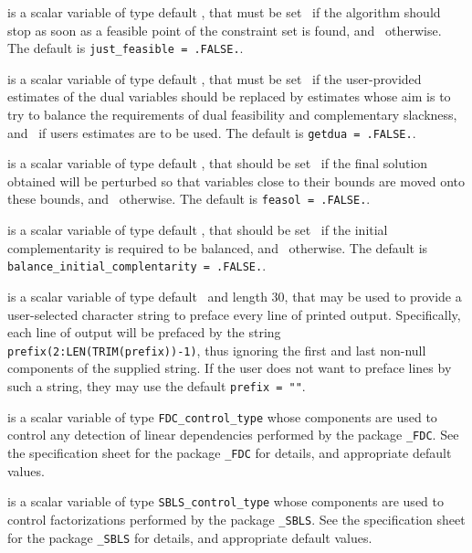 \documentclass{galahad}
\begin{document}
\begin{description}
 is a scalar variable of type default \logical, that 
must be set \true\ if the algorithm should stop as soon as a feasible point
of the constraint set is found, and \false\ otherwise. 
The default is {\tt just\_feasible = .FALSE.}.

 is a scalar variable of type default \logical, that 
must be set \true\ if the user-provided estimates of the dual variables
should be replaced by estimates whose aim is to try to balance the
requirements of dual feasibility and complementary slackness,
and \false\ if users estimates are to be used.
The default is {\tt getdua = .FALSE.}.

 is a scalar variable of type default \logical, that 
should be set \true\ 
if the final solution obtained will be perturbed 
so that variables close to their bounds are moved onto these bounds,
and \false\ otherwise. 
The default is {\tt feasol = .FALSE.}.


 is a scalar variable of type 
default \logical, that should be set \true\
if the initial complementarity is required to be balanced,
and \false\ otherwise.
The default is {\tt balance\_initial\_complentarity = .FALSE.}.

\itt{prefix} is a scalar variable of type default \character\
and length 30, that may be used to provide a user-selected 
character string to preface every line of printed output. 
Specifically, each line of output will be prefaced by the string 
{\tt prefix(2:LEN(TRIM(prefix))-1)},
thus ignoring the first and last non-null components of the
supplied string. If the user does not want to preface lines by such
a string, they may use the default {\tt prefix = ""}.

\itt{FDC\_control} is a scalar variable of type 
{\tt FDC\_control\_type}
whose components are used to control any detection of linear dependencies
performed by the package 
{\tt \libraryname\_FDC}. 
See the specification sheet for the package 
{\tt \libraryname\_FDC} 
for details, and appropriate default values.

\itt{SBLS\_control} is a scalar variable of type 
{\tt SBLS\_control\_type}
whose components are used to control factorizations
performed by the package 
{\tt \libraryname\_SBLS}. 
See the specification sheet for the package 
{\tt \libraryname\_SBLS} 
for details, and appropriate default values.

\end{description}
\end{document}
